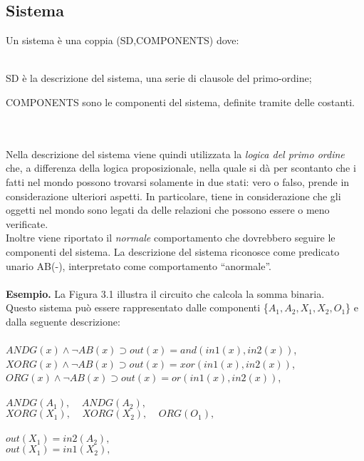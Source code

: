 \documentclass[a4paper,12pt]{report}
\newcommand{\virgolette}[1]{``#1''}
\begin{document}
\subsection{Sistema}
Un sistema è una coppia (SD,COMPONENTS) dove:\\
\\\begin{inparaenum}[1)]
    \item SD è la descrizione del sistema, una serie di clausole del primo-ordine;\\
    \item COMPONENTS sono le componenti del sistema, definite tramite delle costanti.
\end{inparaenum}\\
\\Nella descrizione del sistema viene quindi utilizzata la \textit{logica del primo ordine} che, a differenza della logica proposizionale, nella quale si dà per scontanto che i fatti nel mondo possono trovarsi solamente in due stati: vero o falso, prende in considerazione ulteriori aspetti. In particolare, tiene in considerazione che gli oggetti nel mondo sono legati da delle relazioni che possono essere o meno verificate.\\
Inoltre viene riportato il \textit{normale} comportamento che dovrebbero seguire le componenti del sistema. La descrizione del sistema riconosce come predicato unario AB(-), interpretato come comportamento \virgolette{anormale}.\\
\\\textbf{Esempio.} La Figura 3.1 illustra il circuito che calcola la somma binaria.\\
Questo sistema può essere rappresentato dalle componenti \{$A_1,A_2,X_1,X_2,O_1$\} e dalla seguente descrizione:\\
\\
$ANDG(x)\wedge \neg{AB(x)}\supset out(x) = and(in1(x),in2(x))$,\\
$XORG(x)\wedge \neg{AB(x)}\supset out(x) = xor(in1(x),in2(x))$,\\
$ORG(x)\wedge \neg{AB(x)}\supset out(x) = or(in1(x),in2(x))$,\\
\\ $ANDG(A_1),\ \ \ \ \ ANDG(A_2),$\\
$XORG(X_1),\ \ \ \ \ XORG(X_2),\ \ \ \ \ ORG(O_1),$\\
\\$out(X_1) = in2(A_2),$\\
$out(X_1) = in1(X_2),$\\
\end{document}
